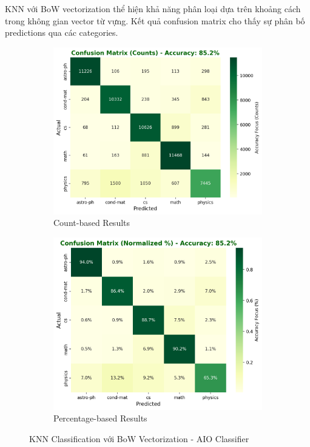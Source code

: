 KNN với BoW vectorization thể hiện khả năng phân loại dựa trên khoảng cách trong không gian vector từ vựng. Kết quả confusion matrix cho thấy sự phân bố predictions qua các categories.

\begin{figure}[H]
\centering
\begin{subfigure}{0.48\textwidth}
    \centering
    \includegraphics[width=\textwidth]{image/Knn_Bow_count.png}
    \caption{Count-based Results}
    \label{fig:knn_bow_count_improvements}
\end{subfigure}
\hfill
\begin{subfigure}{0.48\textwidth}
    \centering
    \includegraphics[width=\textwidth]{image/Knn_Bow_percent.png}
    \caption{Percentage-based Results}
    \label{fig:knn_bow_percent_improvements}
\end{subfigure}
\caption{KNN Classification với BoW Vectorization - AIO Classifier}
\label{fig:knn_bow_results_improvements}
\end{figure}


